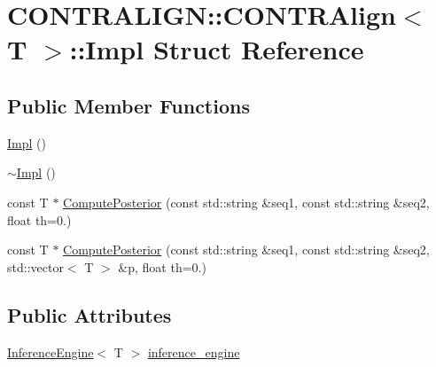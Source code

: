 \hypertarget{struct_c_o_n_t_r_a_l_i_g_n_1_1_c_o_n_t_r_align_1_1_impl}{\section{C\+O\+N\+T\+R\+A\+L\+I\+G\+N\+:\+:C\+O\+N\+T\+R\+Align$<$ T $>$\+:\+:Impl Struct Reference}
\label{struct_c_o_n_t_r_a_l_i_g_n_1_1_c_o_n_t_r_align_1_1_impl}
}
\subsection*{Public Member Functions}
\begin{DoxyCompactItemize}
\item 
\hyperlink{struct_c_o_n_t_r_a_l_i_g_n_1_1_c_o_n_t_r_align_1_1_impl_a3217b0ecb467f9bc214ce6ae7989ae4c}{Impl} ()
\item 
\hyperlink{struct_c_o_n_t_r_a_l_i_g_n_1_1_c_o_n_t_r_align_1_1_impl_a8aa25d9f5587f24b14b44211a0846818}{$\sim$\+Impl} ()
\item 
const T $\ast$ \hyperlink{struct_c_o_n_t_r_a_l_i_g_n_1_1_c_o_n_t_r_align_1_1_impl_a44d5076d9c20bf23dab4ce3285c7afce}{Compute\+Posterior} (const std\+::string \&seq1, const std\+::string \&seq2, float th=0.)
\item 
const T $\ast$ \hyperlink{struct_c_o_n_t_r_a_l_i_g_n_1_1_c_o_n_t_r_align_1_1_impl_a6f4b1346516af707b7b9a4d77956ec47}{Compute\+Posterior} (const std\+::string \&seq1, const std\+::string \&seq2, std\+::vector$<$ T $>$ \&p, float th=0.)
\end{DoxyCompactItemize}
\subsection*{Public Attributes}
\begin{DoxyCompactItemize}
\item 
\hyperlink{class_c_o_n_t_r_a_l_i_g_n_1_1_inference_engine}{Inference\+Engine}$<$ T $>$ \hyperlink{struct_c_o_n_t_r_a_l_i_g_n_1_1_c_o_n_t_r_align_1_1_impl_a57c43c920a6541fd5c37c78bed27881a}{inference\+\_\+engine}
\end{DoxyCompactItemize}


